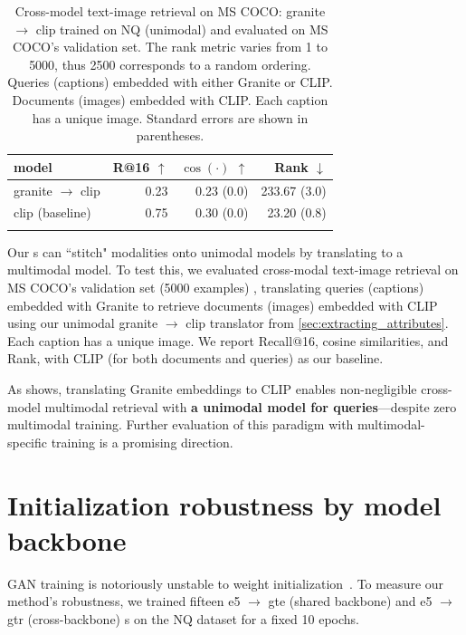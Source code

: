 \begin{table}[!ht]
    \scriptsize
    \centering
    \begin{tabular}{lrrr}
        \toprule
        model& R@16 $\uparrow$ &$\cos(\cdot)$ $\uparrow$ & Rank $\downarrow$\\
        \midrule
        granite $\to$ clip&0.23&0.23 {\tiny (0.0)}&233.67 {\tiny (3.0)}\\
        clip (baseline) &0.75&0.30 {\tiny (0.0)}&23.20 {\tiny (0.8)}\\
        \bottomrule\\[-1.6ex]
    \end{tabular}
    \caption{Cross-model text-image retrieval on MS COCO: granite $\to$ clip \atk{} trained on NQ (unimodal) and evaluated on MS COCO's validation set. The rank metric varies from 1 to 5000, thus 2500 corresponds to a random ordering. Queries (captions) embedded with either Granite or CLIP. Documents (images) embedded with CLIP. Each caption has a unique image. Standard errors are shown in parentheses.}
    \label{tab:msmarco}
\end{table}

Our \atk{}s can ``stitch" modalities onto unimodal models by translating to a multimodal model. To test this, we evaluated cross-modal text-image retrieval on MS COCO's validation set (5000 examples) \cite{lin2014microsoft}, translating queries (captions) embedded with Granite to retrieve documents (images) embedded with CLIP using our unimodal granite $\to$ clip translator from \cref{sec:extracting_attributes}. Each caption has a unique image. We report Recall@16, cosine similarities, and Rank, with CLIP (for both documents and queries) as our baseline.

As  shows, translating Granite embeddings to CLIP enables non-negligible cross-model multimodal retrieval with \textbf{a unimodal model for queries}—despite zero multimodal training. Further evaluation of this paradigm with multimodal-specific training is a promising direction.


\section{Initialization robustness by model backbone}
\label{sec:stability}

GAN training is notoriously unstable to weight initialization~\cite{10.1145/3446374}. To measure our method's robustness, we trained fifteen e5 $\to$ gte (shared backbone) and e5 $\to$ gtr (cross-backbone) \atk{}s on the NQ dataset for a fixed 10 epochs.

